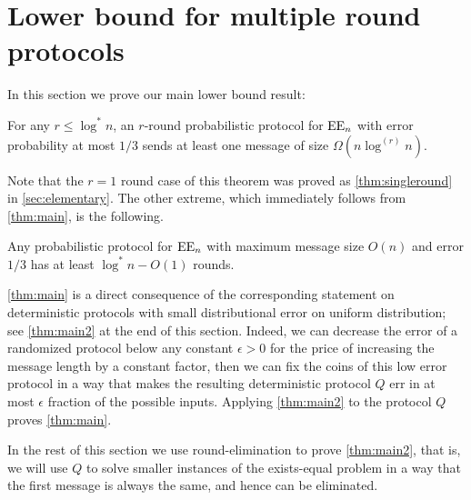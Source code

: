 \section{Lower bound for multiple round protocols}
\label{sec:lowerbound}



In this section we prove our main lower bound result:
\begin{theorem}
\label{thm:main}
For any $r\leq\log^*n$, an $r$-round probabilistic protocol for
$\operatorname{EE}_n$ with error probability at most $1/3$ sends at least one
message of size $\Omega(n\log^{(r)}n)$.
\end{theorem}

Note that the $r=1$ round case of this theorem was proved as
\autoref{thm:singleround} in \autoref{sec:elementary}. The other
extreme, which immediately follows from \autoref{thm:main}, is
the following.

\begin{corollary}
Any probabilistic protocol for $\operatorname{EE}_n$ with maximum message size
$O(n)$ and error $1/3$ has at least $\log^* n - O(1)$ rounds.
\end{corollary}

\autoref{thm:main} is a direct consequence of the corresponding
statement on deterministic protocols with small distributional
error on uniform distribution; see \autoref{thm:main2} at the
end of this section. Indeed, we can decrease the error of a
randomized protocol below any constant $\epsilon>0$ for the
price of increasing the message length by a constant factor,
then we can fix the coins of this low error protocol in a way
that makes the resulting deterministic protocol $Q$ err in at
most $\epsilon$ fraction of the possible inputs. Applying
\autoref{thm:main2} to the protocol $Q$ proves
\autoref{thm:main}.

In the rest of this section we use round-elimination to prove
\autoref{thm:main2}, that is, we will use $Q$ to solve smaller
instances of the exists-equal problem in a way that the first
message is always the same, and hence can be eliminated.

